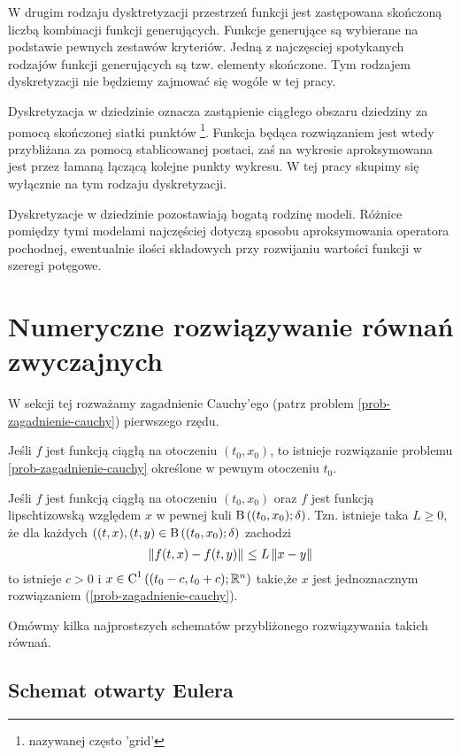 \documentclass[12pt,a4paper]{report}
\begin{document}
\begin{example} 
W drugim rodzaju dysktretyzacji przestrzeń funkcji jest zastępowana skończoną liczbą kombinacji funkcji generujących. Funkcje generujące są wybierane na podstawie pewnych zestawów kryteriów. Jedną z najczęsciej spotykanych rodzajów funkcji generujących są tzw. elementy skończone. Tym rodzajem dyskretyzacji nie będziemy zajmować się wogóle w tej pracy.

Dyskretyzacja w dziedzinie oznacza zastąpienie ciągłego obszaru dziedziny za pomocą skończonej siatki punktów \footnote{nazywanej często 'grid'}. Funkcja będąca rozwiązaniem jest wtedy przybliżana za pomocą stablicowanej postaci, zaś na wykresie aproksymowana jest przez łamaną łączącą kolejne punkty wykresu. W tej pracy skupimy się wyłącznie na tym rodzaju dyskretyzacji. 

Dyskretyzacje w dziedzinie pozostawiają bogatą rodzinę modeli. Różnice pomiędzy tymi modelami najczęściej dotyczą sposobu aproksymowania operatora pochodnej, ewentualnie ilości składowych przy rozwijaniu wartości funkcji w szeregi potęgowe. 


\section{Numeryczne rozwiązywanie równań zwyczajnych}

W sekcji tej rozważamy zagadnienie Cauchy'ego (patrz problem \ref{prob-zagadnienie-cauchy}) pierwszego rzędu. 


\begin{theorem}[Peano]
Jeśli $f$ jest funkcją ciągłą na otoczeniu $(t_{0},x_{0})$, to istnieje rozwiązanie problemu \ref{prob-zagadnienie-cauchy} określone w pewnym otoczeniu $t_{0}$. 
\end{theorem}

\begin{theorem}
Jeśli $f$ jest funkcją ciągłą na otoczeniu $(t_{0},x_{0})$ oraz $f$ jest funkcją lipschtizowską względem $x$ w pewnej kuli $\ball{(t_0,x_0)}{\delta}$. Tzn.
 istnieje taka $L\geq 0$, że dla każdych $((t,x),(t,y) \in \ball{(t_0,x_0)}{\delta} $ zachodzi
$$
  \left\| {f(t,x) - f(t,y)} \right\|_{} \leq L \left\| { x-y} \right\|_{} 
$$
 to istnieje $ c> 0 $ i $x \in \Ck{1}{(t_0-c,t_0+c); \setR^{n} }  $ takie,że $x$ jest jednoznacznym rozwiązaniem (\ref{prob-zagadnienie-cauchy}).
\end{theorem}


Omówmy kilka najprostszych schematów przybliżonego rozwiązywania takich równań.

\subsection{Schemat otwarty Eulera}


\end{example}
\end{document}
